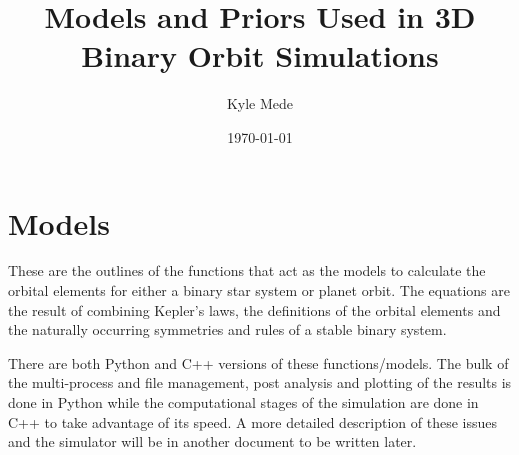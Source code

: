 \documentclass[10pt,preprint]{aastex}
\title{Models and Priors Used in 3D Binary Orbit Simulations}
\author{Kyle Mede}
\date{\today}
\begin{document}
\maketitle


\tableofcontents

\section{Models}

These are the outlines of the functions that act as the models to calculate the orbital elements for either a binary star system or planet orbit.  The equations are the result of combining Kepler's laws, the definitions of the orbital elements and the naturally occurring symmetries and rules of a stable binary system.

There are both Python and C++ versions of these functions/models.  The bulk of the multi-process and file management,  post analysis and plotting of the results is done in Python while the computational stages of the simulation are done in C++ to take advantage of its speed.  A more detailed description of these issues and the simulator will be in another document to be written later.





\end{document}
